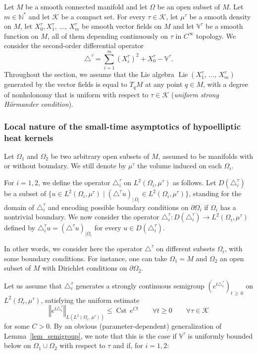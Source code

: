 \documentclass[10pt]{amsart}
\theoremstyle{definition}\newtheorem{defi}[theo]{Definition}\newtheorem{rema}[theo]{Remark}\newtheorem{exam}[theo]{Example}\newtheorem{exem}[theo]{Example}\newtheorem{nota}[theo]{Notation}
\newcommand*\N{\mathbb{N}}
\newcommand{\bbV}{\mathbb{V}}
\newcommand{\calK}{\mathcal{K}}
\DeclareMathOperator{\Cst}{Cst}
\DeclareMathOperator{\Lie}{Lie}
\renewcommand{\geq}{\geqslant}
\renewcommand{\leq}{\leqslant}
\let\oldforall\forall
\renewcommand*{\forall}{\mathrel{\oldforall}}
\begin{document}
Let $M$ be a smooth connected manifold and let $\Omega$ be an open subset of $M$. Let $m\in\N^*$ and let $\calK$ be a compact set. For every $\tau\in\calK$, let $\mu^\tau$ be a smooth density on $M$, let $X_0^\tau,X_1^\tau,\,\ldots,\,X_m^\tau$ be smooth vector fields on $M$ and let $\bbV^\tau$ be a smooth function on $M$, all of them depending continuously on $\tau$ in $C^\infty$ topology. We consider the second-order differential operator
\begin{equation*}
\triangle^\tau = \sum_{i=1}^m (X_i^\tau)^2 + X_0^\tau - \bbV^\tau.
\end{equation*}
Throughout the section, we assume that the Lie algebra $\Lie(X_1^\tau,\,\ldots,\,X_m^\tau)$ generated by the vector fields is equal to $T_qM$ at any point $q\in M$, with a degree of nonholonomy that is uniform with respect to $\tau\in\calK$ (\emph{uniform strong H\"ormander condition}).


\subsubsection{Local nature of the small-time asymptotics of hypoelliptic heat kernels}\label{sec_localheat}
Let $\Omega_1$ and $\Omega_2$ be two arbitrary open subsets of $M$, assumed to be manifolds with or without boundary. We still denote by $\mu^\tau$ the volume induced on each $\Omega_i$.

For $i=1,2$, we define the operator $\triangle^\tau_i$ on $L^2(\Omega_i,\mu^\tau)$ as follows. Let $D(\triangle^\tau_i)$ be a subset of $\{ u\in L^2(\Omega_i,\mu^\tau) \mid (\triangle^\tau u)_{\vert\,\Omega_i} \in L^2(\Omega_i,\mu^\tau) \}$, standing for the domain of $\triangle^\tau_i$ and encoding possible boundary conditions on $\partial \Omega_i$ if $\Omega_i$ has a nontrivial boundary. We now consider the operator $\triangle^\tau_i:D(\triangle^\tau_i)\rightarrow L^2(\Omega_i,\mu^\tau)$ defined by $\triangle^\tau_i u=(\triangle^\tau u)_{\vert \Omega_i}$ for every $u\in D(\triangle^\tau_i)$.

In other words, we consider here the operator $\triangle^\tau$ on different subsets $\Omega_i$, with some boundary conditions. For instance, one can take $\Omega_1=M$ and $\Omega_2$ an open subset of $M$ with Dirichlet conditions on $\partial \Omega_2$.

Let us assume that $\triangle^\tau_i$ generates a strongly continuous semigroup $(e^{t\triangle^\tau_i})_{t\,\geq\,0}$ on $L^2(\Omega_i,\mu^\tau)$, satisfying the uniform estimate
\[
\left\Vert e^{t\triangle^\tau_i} \right\Vert_{L\left(L^2(\Omega_i,\,\mu^\tau)\right)} \leq \Cst\, e^{C t}\qquad \forall t\geq 0\qquad \forall \tau\in\calK
\]
for some $C>0$. By an obvious (parameter-dependent) generalization of Lemma~\ref{lem_semigroup}, we note that this is the case if $\bbV^\tau$ is uniformly bounded below on $\Omega_1\cup \Omega_2$ with respect to $\tau$ and if, for $i=1,2$:
\goodbreak
\end{document}
